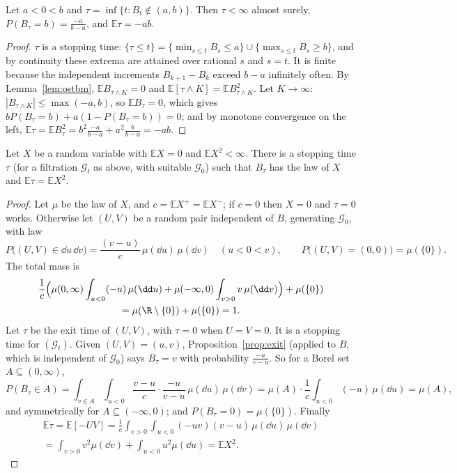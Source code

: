 \begin{proposition}\label{prop:exit}
Let $a<0<b$ and $\tau=\inf\{t:B_t\notin(a,b)\}$. Then $\tau<\infty$ almost surely, $P(B_\tau=b)=\frac{-a}{b-a}$, and $\mathbb E\tau=-ab$.
\end{proposition}
\begin{proof}
$\tau$ is a stopping time: $\{\tau\le t\}=\{\min_{s\le t}B_s\le a\}\cup\{\max_{s\le t}B_s\ge b\}$, and by continuity these extrema are attained over rational $s$ and $s=t$. It is
finite because the independent increments $B_{k+1}-B_k$ exceed $b-a$ infinitely often. By Lemma~\ref{lem:ostbm}, $\mathbb E B_{\tau\wedge K}=0$ and $\mathbb E[\tau\wedge K]=\mathbb E
B_{\tau\wedge K}^2$. Let $K\to\infty$: $|B_{\tau\wedge K}|\le\max(-a,b)$, so $\mathbb E B_\tau=0$, which gives $bP(B_\tau=b)+a(1-P(B_\tau=b))=0$; and by monotone convergence on the left,
$\mathbb E\tau=\mathbb E B_\tau^2=b^2\frac{-a}{b-a}+a^2\frac b{b-a}=-ab$.
\end{proof}

\begin{theorem}\label{thm:skorokhod}
Let $X$ be a random variable with $\mathbb E X=0$ and $\mathbb E X^2<\infty$. There is a stopping time $\tau$ (for a filtration $\mathcal G_t$ as above, with suitable
$\mathcal G_0$) such that $B_\tau$ has the law of $X$ and $\mathbb E\tau=\mathbb E X^2$.
\end{theorem}
\begin{proof}
Let $\mu$ be the law of $X$, and $c=\mathbb E X^+=\mathbb E X^-$; if $c=0$ then $X=0$ and $\tau=0$ works. Otherwise let $(U,V)$ be a random pair independent of $B$, generating
$\mathcal G_0$, with law
\[
P\bigl((U,V)\in\dd u\,\dd v\bigr)=\frac{(v-u)}c\,\mu(\dd u)\,\mu(\dd v)\quad(u<0<v),\qquad P\bigl((U,V)=(0,0)\bigr)=\mu(\{0\}).
\]
The total mass is
\[
\begin{gathered}
\frac1c\Bigl(\mu(0,\infty)\int_{u<0}(-u)\,\mu(\dd u)+\mu(-\infty,0)\int_{v>0}v\,\mu(\dd v)\Bigr)+\mu(\{0\})\\
=\mu(\R\setminus\{0\})+\mu(\{0\})=1.
\end{gathered}
\]
Let $\tau$
be the exit time of $(U,V)$, with $\tau=0$ when $U=V=0$. It is a stopping time for $(\mathcal G_t)$. Given $(U,V)=(u,v)$, Proposition~\ref{prop:exit} (applied to $B$, which is
independent of $\mathcal G_0$) says $B_\tau=v$ with probability $\frac{-u}{v-u}$. So for a Borel set $A\subseteq(0,\infty)$,
\[
P(B_\tau\in A)=\int_{v\in A}\int_{u<0}\frac{v-u}c\cdot\frac{-u}{v-u}\,\mu(\dd u)\,\mu(\dd v)=\mu(A)\cdot\frac1c\int_{u<0}(-u)\,\mu(\dd u)=\mu(A),
\]
and symmetrically for $A\subseteq(-\infty,0)$; and $P(B_\tau=0)=\mu(\{0\})$. Finally
\[
\begin{gathered}
\mathbb E\tau=\mathbb E[-UV]=\frac1c\int_{v>0}\int_{u<0}(-uv)(v-u)\,\mu(\dd u)\,\mu(\dd v)\\=\int_{v>0}v^2\mu(\dd v)+\int_{u<0}u^2\mu(\dd u)=\mathbb E X^2.
\end{gathered}
\]
\end{proof}

